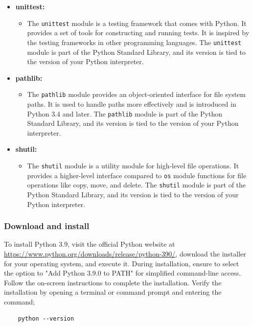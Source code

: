 \begin{itemize}
	\item \textbf{unittest:}
	\begin{itemize}
		\item The \texttt{unittest} module is a testing framework that comes with Python. It provides a set of tools for constructing and running tests. It is inspired by the testing frameworks in other programming languages. The \texttt{unittest} module is part of the Python Standard Library, and its version is tied to the version of your Python interpreter. 
	\end{itemize}
	
	\item \textbf{pathlib:}
	\begin{itemize}
		\item The \texttt{pathlib} module provides an object-oriented interface for file system paths. It is used to handle paths more effectively and is introduced in Python 3.4 and later. The \texttt{pathlib} module is part of the Python Standard Library, and its version is tied to the version of your Python interpreter. 
	\end{itemize}
	
	\item \textbf{shutil:}
	\begin{itemize}
		\item The \texttt{shutil} module is a utility module for high-level file operations. It provides a higher-level interface compared to \texttt{os} module functions for file operations like copy, move, and delete. The \texttt{shutil} module is part of the Python Standard Library, and its version is tied to the version of your Python interpreter. 
	\end{itemize}
\end{itemize}


\subsubsection{Download and install}

To install Python 3.9, visit the official Python website at \url{https://www.python.org/downloads/release/python-390/}, download the installer for your operating system, and execute it. During installation, ensure to select the option to "Add Python 3.9.0 to PATH" for simplified command-line access. Follow the on-screen instructions to complete the installation. Verify the installation by opening a terminal or command prompt and entering the command; 

\begin{verbatim}
	python --version
\end{verbatim}

